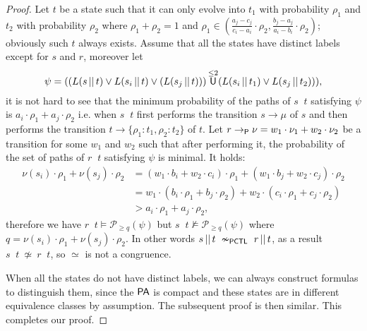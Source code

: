\documentclass{LMCS}
\DeclareMathOperator{\interleave}{||}
\DeclareMathOperator{\U}{\text{\sf U}}
\newcommand{\TRAN}[2]{#1\rightarrow #2}
\newcommand{\TRANP}[2]{#1\rightarrow_{{\sf P}}#2}
\newcommand{\PA}{{\sf PA}}
\newcommand{\PCTL}{{\sf PCTL}}
\newcommand{\nEPCTL}{\nsim_{\PCTL}}
\newcommand{\PAR}[2]{#1\interleave#2}
\newcommand{\MC}[1]{\mathcal{#1}}
\begin{document}
\begin{proof}
Let $t$ be a state such that it can only evolve into $t_1$ with
probability $\rho_1$ and $t_2$ with probability $\rho_2$ where $\rho_1+\rho_2=1$ and
$\rho_1\in(\frac{a_j-c_j}{c_i-a_i}\cdot\rho_2,\frac{b_j-a_j}{a_i-b_i}\cdot\rho_2)$;
obviously such $t$ always exists. Assume that all the states have
distinct labels except for $s$ and $r$, moreover let
\[\psi=((L(s\interleave t)\lor L(s_i\interleave
t)\lor(L(s_j\interleave t)))\U^{\leq 2} (L(s_i\interleave t_1)\lor
L(s_j\interleave t_2))),\] it is not hard to see that the minimum
probability of the paths of $\PAR{s}{t}$ satisfying $\psi$ is
$a_i\cdot\rho_1 + a_j\cdot\rho_2$ i.e. when $\PAR{s}{t}$ first
performs the transition $s\TRAN{}\mu$ of $s$ and then performs the
transition $t\TRAN{}\{\rho_1:t_1,\rho_2:t_2\}$ of $t$. Let
$r\TRANP{}\nu=w_1\cdot\nu_1+w_2\cdot\nu_2$ 
be a transition for some $w_1$ and $w_2$ such that after performing it,
the probability of the set of paths of $\PAR{r}{t}$ satisfying $\psi$ is
minimal. It holds:
\begin{align*}
\nu(s_i)\cdot\rho_1+\nu(s_j)\cdot\rho_2 &=(w_1\cdot b_i+w_2\cdot c_i)\cdot\rho_1 + (w_1\cdot b_j + w_2\cdot c_j)\cdot\rho_2\\
& = w_1\cdot(b_i\cdot\rho_1 + b_j\cdot\rho_2) + w_2\cdot(c_i\cdot\rho_1 + c_j\cdot\rho_2)\\
& > a_i\cdot\rho_1 + a_j\cdot\rho_2,
\end{align*}
therefore we have $\PAR{r}{t}\models\MC{P}_{\geq q}(\psi)$
but $\PAR{s}{t}\not\models\MC{P}_{\geq q}(\psi)$ where
$q=\nu(s_i)\cdot\rho_1+\nu(s_j)\cdot\rho_2$. In other words
$\PAR{s}{t}~\nEPCTL~\PAR{r}{t}$, as a result
$\PAR{s}{t}~\not\simeq~\PAR{r}{t}$, so $\simeq$ is not a congruence.

When all the states do not have distinct labels,
we can always construct formulas to distinguish them,
since the $\PA$ is compact and these states are in different equivalence classes by assumption.
The subsequent proof is then similar. This completes our proof.
\end{proof}
\end{document}
